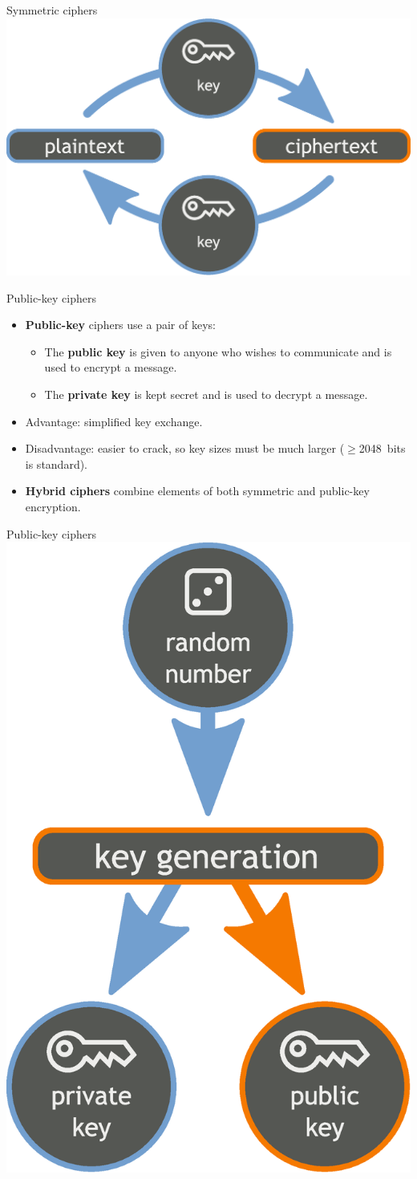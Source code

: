 \documentclass[
mode=present,
paper=smartboard,
size=20pt,
]{powerdot}
\begin{document}
\begin{slide}[toc=]{Symmetric ciphers}
\centering\includegraphics[width=0.9\linewidth]{images/Orange_blue_symmetric_cryptography_en}
\end{slide}

\begin{slide}{Public-key ciphers}
  \begin{itemize}
  \item \textbf{Public-key} ciphers use a pair of keys:
    \begin{itemize}
    \item The \textbf{public key} is given to anyone who wishes to
      communicate and is used to encrypt a message.
    \item The \textbf{private key} is kept secret and is used to
      decrypt a message.
    \end{itemize}
  \item Advantage: simplified key exchange.
  \item Disadvantage: easier to crack, so key sizes must be much
    larger ($\geq$2048~bits is standard).
  \item \textbf{Hybrid ciphers} combine elements of both symmetric and
    public-key encryption.
  \end{itemize}
\end{slide}

\begin{slide}[toc=]{Public-key ciphers}
\centering\includegraphics[width=0.35\linewidth]{images/Orange_blue_public_private_keygeneration_en.eps}
\end{slide}
\end{document}
